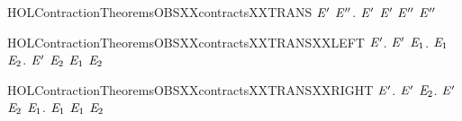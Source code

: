 \begin{SaveVerbatim}{HOLContractionTheoremsOBSXXcontractsXXTRANS}
\HOLTokenTurnstile{} \HOLSymConst{\HOLTokenForall{}} \ensuremath{\HOLBoundVar{E}\sp{\prime{}}} \ensuremath{\HOLBoundVar{E}\sp{\prime{}\prime{}}}.
       \ensuremath{\HOLBoundVar{E}\sp{\prime{}}} \HOLSymConst{\HOLTokenConj{}}  \ensuremath{\HOLBoundVar{E}\sp{\prime{}}} \ensuremath{\HOLBoundVar{E}\sp{\prime{}\prime{}}} \HOLSymConst{\HOLTokenImp{}}
       \ensuremath{\HOLBoundVar{E}\sp{\prime{}\prime{}}}
\end{SaveVerbatim}
\newcommand{\HOLContractionTheoremsOBSXXcontractsXXTRANS}{\UseVerbatim{HOLContractionTheoremsOBSXXcontractsXXTRANS}}
\begin{SaveVerbatim}{HOLContractionTheoremsOBSXXcontractsXXTRANSXXLEFT}
\HOLTokenTurnstile{} \HOLSymConst{\HOLTokenForall{}} \ensuremath{\HOLBoundVar{E}\sp{\prime{}}}.
       \ensuremath{\HOLBoundVar{E}\sp{\prime{}}} \HOLSymConst{\HOLTokenImp{}}
     \HOLSymConst{\HOLTokenForall{}} \ensuremath{\HOLBoundVar{E}\sb{\mathrm{1}}}.  \HOLTokenTransBegin{}\HOLTokenTransEnd \ensuremath{\HOLBoundVar{E}\sb{\mathrm{1}}} \HOLSymConst{\HOLTokenImp{}} \HOLSymConst{\HOLTokenExists{}}\ensuremath{\HOLBoundVar{E}\sb{\mathrm{2}}}. \ensuremath{\HOLBoundVar{E}\sp{\prime{}}} \HOLTokenTransBegin{}\HOLTokenTransEnd \ensuremath{\HOLBoundVar{E}\sb{\mathrm{2}}} \HOLSymConst{\HOLTokenConj{}} \ensuremath{\HOLBoundVar{E}\sb{\mathrm{1}}}  \ensuremath{\HOLBoundVar{E}\sb{\mathrm{2}}}
\end{SaveVerbatim}
\newcommand{\HOLContractionTheoremsOBSXXcontractsXXTRANSXXLEFT}{\UseVerbatim{HOLContractionTheoremsOBSXXcontractsXXTRANSXXLEFT}}
\begin{SaveVerbatim}{HOLContractionTheoremsOBSXXcontractsXXTRANSXXRIGHT}
\HOLTokenTurnstile{} \HOLSymConst{\HOLTokenForall{}} \ensuremath{\HOLBoundVar{E}\sp{\prime{}}}.
       \ensuremath{\HOLBoundVar{E}\sp{\prime{}}} \HOLSymConst{\HOLTokenImp{}}
     \HOLSymConst{\HOLTokenForall{}} \ensuremath{\HOLBoundVar{E}\sb{\mathrm{2}}}. \ensuremath{\HOLBoundVar{E}\sp{\prime{}}} \HOLTokenTransBegin{}\HOLTokenTransEnd \ensuremath{\HOLBoundVar{E}\sb{\mathrm{2}}} \HOLSymConst{\HOLTokenImp{}} \HOLSymConst{\HOLTokenExists{}}\ensuremath{\HOLBoundVar{E}\sb{\mathrm{1}}}.  \HOLTokenWeakTransBegin{}\HOLTokenWeakTransEnd \ensuremath{\HOLBoundVar{E}\sb{\mathrm{1}}} \HOLSymConst{\HOLTokenConj{}}  \ensuremath{\HOLBoundVar{E}\sb{\mathrm{1}}} \ensuremath{\HOLBoundVar{E}\sb{\mathrm{2}}}
\end{SaveVerbatim}
